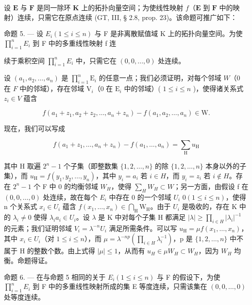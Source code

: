 设 \(\mathbf{E}\) 与 \(\mathbf{F}\) 是同一除环 \(\mathbf{K}\) 上的拓扑向量空间；为使线性映射 \(f\)（\(\mathbf{E}\) 到 \(\mathbf{F}\) 中的映射）连续，只需它在原点连续 (GT, III, § 2.8, prop. 23)。该命题可推广如下：

命题 5. --- 设 \(E_{i}(1 \leqslant i \leqslant n)\) 与 F 是非离散赋值域 K 上的拓扑向量空间。为使 \(\prod_{i=1}^{n} E_{i}\) 到 F 中的多重线性映射 f 连

续于乘积空间 \(\prod_{i=1}^{n} E_i\) 中，只需它在 \((0, 0, ..., 0)\) 处连续。

设 \((a_{1}, a_{2}, \ldots, a_{n})\) 是 \(\prod_{i=1}^{n} \mathrm{E}_{i}\) 的任意一点；我们必须证明，对每个邻域 \(W\)（0 在 \(F\) 中的邻域），存在邻域 \(\mathrm{V}_{i}\)（0 在 \(\mathrm{E}_{i}\) 中的邻域）( \(1 \leqslant i \leqslant n\) )，使得诸关系式 \(z_{i} \in V\) 蕴含

\[
f \left(a _ {1} + z _ {1}, a _ {2} + z _ {2}, \dots , a _ {n} + z _ {n}\right) - f \left(a _ {1}, a _ {2}, \dots , a _ {n}\right) \in \mathrm{W}.
\]

现在，我们可以写成

\[
f (a _ {1} + z _ {1}, \dots , a _ {n} + z _ {n}) - f (a _ {1}, \dots , a _ {n}) = \sum_ {\mathrm{H}} u _ {\mathrm{H}}
\]

其中 H 取遍 \(2^{n}-1\) 个子集（即整数集 \(\{1,2,\ldots,n\}\) 的除 \(\{1,2,\ldots,n\}\) 本身以外的子集），而 \(u_{\mathrm{H}}=f(y_{1},y_{2},\ldots,y_{n})\)，其中 \(y_{i}=a_{i}\) 若 \(i\in H\)，而 \(y_{i}=z_{i}\) 若 \(i\notin H\)。存在 \(2^{n}-1\) 个 F 中 0 的均衡邻域 \(W_{H}\)，使得 \(\sum_{H}W_{H}\subset W\)；另一方面，由假设 f 在 \((0,0,\ldots,0)\) 处连续，故在每个 \(E_{i}\) 中存在 0 的一个邻域 \(U_{i}\) \(0(1\leqslant i\leqslant n)\)，使得 n 个关系式 \(x_{i}\in U_{i}\) 蕴含 \(f(x_{1},\ldots,x_{n})\in\bigcap_{\mathrm{H}}\mathrm{W}_{\mathrm{H}}\)。由于 \(U_{i}\) 是吸收的，存在 K 中的 \(\lambda_{i}\neq0\) 使得 \(\lambda_{i}a_{i}\in U_{i}\)。设 \(\lambda\) 是 K 中对每个子集 H 都满足 \(|\lambda|\geqslant\prod_{i\in H}|\lambda_{i}|^{-1}\) 的元素；我们证明邻域 \(V_{i}=\lambda^{-n}U_{i}\) 满足所需条件。可以写 \(u_{\mathrm{H}}=\mu f(x_{1},\ldots,x_{n})\)，其中 \(x_{i}\in U_{i}\)（对 \(1\leqslant i\leqslant n\)），而 \(\mu=\lambda^{-np}(\prod_{i\in H}\lambda_{i}^{-1})\)，p 是 \(\{1,2,\ldots,n\}\) 中不属于 H 的整数个数。由上式得 \(|\mu|\leqslant1\)，从而有 \(u_{H}\in\mu W_{H}\subset W_{H}\)，因为 \(W_{H}\) 均衡。命题得证。

命题 6. --- 在与命题 5 相同的关于 \(E_{i}(1 \leqslant i \leqslant n)\) 与 F 的假设下，为使 \(\prod_{i=1}^{n} E_{i}\) 到 F 中的多重线性映射所成的集 E 等度连续，只需该集在 \((0, 0, \ldots, 0)\) 处等度连续。

